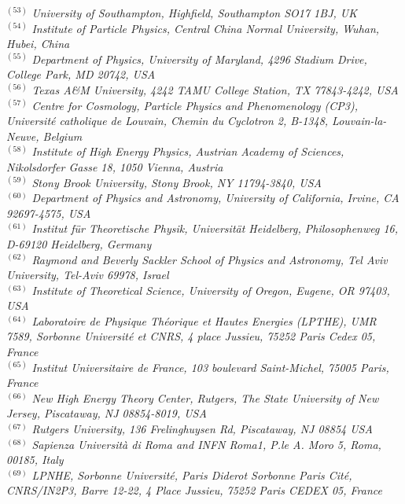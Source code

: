 {\begin{center}
$^{(53)}$ \emph{University of Southampton, Highfield, Southampton SO17 1BJ, UK}\\
$^{(54)}$ \emph{Institute of Particle Physics, Central China Normal University, Wuhan, Hubei, China}\\
$^{(55)}$ \emph{Department of Physics, University of Maryland, 4296 Stadium Drive, College Park, MD  20742,  USA}\\
$^{(56)}$ \emph{Texas A\&M University, 4242 TAMU College Station, TX 77843-4242, USA}\\
$^{(57)}$ \emph{Centre for Cosmology, Particle Physics and Phenomenology (CP3), Universit\'e catholique de Louvain, Chemin du Cyclotron 2, B-1348, Louvain-la-Neuve, Belgium}\\
$^{(58)}$ \emph{Institute of High Energy Physics, Austrian Academy of Sciences, Nikolsdorfer Gasse 18, 1050 Vienna, Austria}\\
$^{(59)}$ \emph{Stony Brook University, Stony Brook, NY 11794-3840, USA}\\
$^{(60)}$ \emph{Department of Physics and Astronomy, University of California, Irvine, CA 92697-4575, USA}\\
$^{(61)}$ \emph{Institut  f\"ur Theoretische Physik, Universit\"at Heidelberg, Philosophenweg 16, D-69120 Heidelberg, Germany}\\
$^{(62)}$ \emph{Raymond and Beverly Sackler School of Physics and Astronomy, Tel Aviv University, Tel-Aviv 69978, Israel}\\
$^{(63)}$ \emph{Institute of Theoretical Science, University of Oregon, Eugene, OR 97403, USA}\\
$^{(64)}$ \emph{Laboratoire de Physique Th\'eorique et Hautes Energies (LPTHE), UMR 7589, Sorbonne Universit\'e et CNRS, 4 place Jussieu, 75252 Paris Cedex 05, France}\\
$^{(65)}$ \emph{Institut Universitaire de France, 103 boulevard Saint-Michel, 75005 Paris, France}\\
$^{(66)}$ \emph{New High Energy Theory Center, Rutgers, The State University of New Jersey, Piscataway, NJ 08854-8019, USA}\\
$^{(67)}$ \emph{Rutgers University, 136 Frelinghuysen Rd, Piscataway, NJ 08854 USA}\\
$^{(68)}$ \emph{Sapienza Universit\`a di Roma and INFN Roma1, P.le A. Moro 5, Roma, 00185, Italy}\\
$^{(69)}$ \emph{LPNHE, Sorbonne Universit{\'e}, Paris Diderot Sorbonne Paris Cit{\'e}, CNRS/IN2P3, Barre 12-22, 4 Place Jussieu, 75252 Paris CEDEX 05, France}\\

\end{center}}
